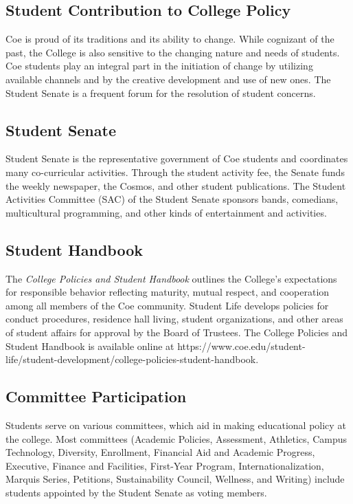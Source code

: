 \documentclass[
  letterpaper,
]{scrbook}
\begin{document}
\subsection{Student Contribution to College
Policy}\label{student-contribution-to-college-policy}

Coe is proud of its traditions and its ability to change. While
cognizant of the past, the College is also sensitive to the changing
nature and needs of students. Coe students play an integral part in the
initiation of change by utilizing available channels and by the creative
development and use of new ones. The Student Senate is a frequent forum
for the resolution of student concerns.

\subsection{Student Senate}\label{student-senate}

Student Senate is the representative government of Coe students and
coordinates many co-curricular activities. Through the student activity
fee, the Senate funds the weekly newspaper, the Cosmos, and other
student publications. The Student Activities Committee (SAC) of the
Student Senate sponsors bands, comedians, multicultural programming, and
other kinds of entertainment and activities.

\subsection{Student Handbook}\label{student-handbook}

The \emph{College Policies and Student Handbook} outlines the College's
expectations for responsible behavior reflecting maturity, mutual
respect, and cooperation among all members of the Coe community. Student
Life develops policies for conduct procedures, residence hall living,
student organizations, and other areas of student affairs for approval
by the Board of Trustees. The College Policies and Student Handbook is
available online at
https://www.coe.edu/student-life/student-development/college-policies-student-handbook.

\subsection{Committee Participation}\label{committee-participation}

Students serve on various committees, which aid in making educational
policy at the college. Most committees (Academic Policies, Assessment,
Athletics, Campus Technology, Diversity, Enrollment, Financial Aid and
Academic Progress, Executive, Finance and Facilities, First-Year
Program, Internationalization, Marquis Series, Petitions, Sustainability
Council, Wellness, and Writing) include students appointed by the
Student Senate as voting members.
\end{document}
